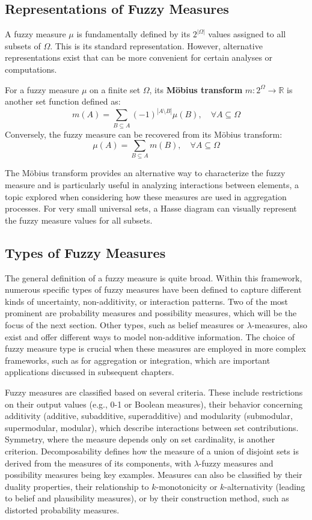 \subsection{Representations of Fuzzy Measures}
A fuzzy measure $\mu$ is fundamentally defined by its $2^{|\Omega|}$ values assigned to all subsets of $\Omega$. This is its standard representation. However, alternative representations exist that can be more convenient for certain analyses or computations.
\begin{definition}
For a fuzzy measure $\mu$ on a finite set $\Omega$, its \textbf{Möbius transform} $m: 2^\Omega \to \mathbb{R}$ is another set function defined as:
\[ m(A) = \sum_{B \subseteq A} (-1)^{|A \setminus B|} \mu(B), \quad \forall A \subseteq \Omega \]
Conversely, the fuzzy measure can be recovered from its Möbius transform:
\[ \mu(A) = \sum_{B \subseteq A} m(B), \quad \forall A \subseteq \Omega \]
\end{definition}
The Möbius transform provides an alternative way to characterize the fuzzy measure and is particularly useful in analyzing interactions between elements, a topic explored when considering how these measures are used in aggregation processes. For very small universal sets, a Hasse diagram can visually represent the fuzzy measure values for all subsets.

\subsection{Types of Fuzzy Measures}
The general definition of a fuzzy measure is quite broad. Within this framework, numerous specific types of fuzzy measures have been defined to capture different kinds of uncertainty, non-additivity, or interaction patterns. Two of the most prominent are probability measures and possibility measures, which will be the focus of the next section. Other types, such as belief measures or $\lambda$-measures, also exist and offer different ways to model non-additive information. The choice of fuzzy measure type is crucial when these measures are employed in more complex frameworks, such as for aggregation or integration, which are important applications discussed in subsequent chapters.

Fuzzy measures are classified based on several criteria. These include restrictions on their output values (e.g., 0-1 or Boolean measures), their behavior concerning additivity  (additive, subadditive, superadditive) and modularity (submodular, supermodular, modular), which describe interactions between set contributions. Symmetry, where the measure depends only on set cardinality, is another criterion. Decomposability defines how the measure of a union of disjoint sets is derived from the measures of its components, with $\lambda$-fuzzy measures and possibility measures being key examples. Measures can also be classified by their duality properties, their relationship to $k$-monotonicity or $k$-alternativity (leading to belief and plausibility measures), or by their construction method, such as distorted probability measures.

